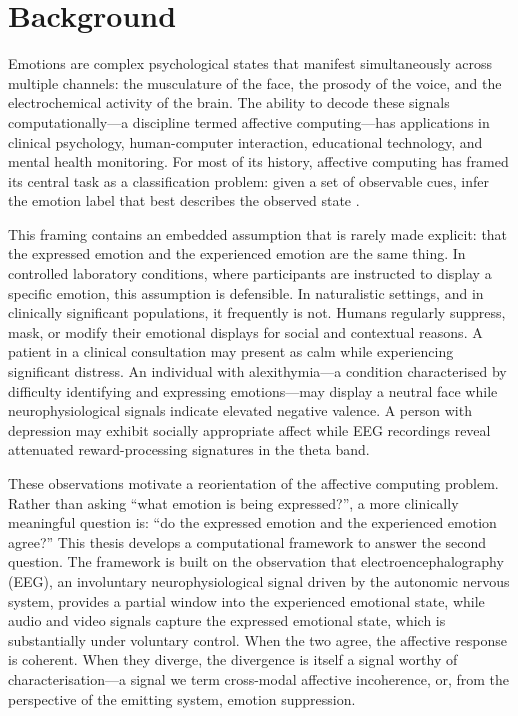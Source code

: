 \section{Background}
Emotions are complex psychological states that manifest simultaneously across multiple channels: the musculature of the face, the prosody of the voice, and the electrochemical activity of the brain. The ability to decode these signals computationally---a discipline termed affective computing---has applications in clinical psychology, human-computer interaction, educational technology, and mental health monitoring. For most of its history, affective computing has framed its central task as a classification problem: given a set of observable cues, infer the emotion label that best describes the observed state \cite{Picard1997AffectiveComputing}.

This framing contains an embedded assumption that is rarely made explicit: that the expressed emotion and the experienced emotion are the same thing. In controlled laboratory conditions, where participants are instructed to display a specific emotion, this assumption is defensible. In naturalistic settings, and in clinically significant populations, it frequently is not. Humans regularly suppress, mask, or modify their emotional displays for social and contextual reasons. A patient in a clinical consultation may present as calm while experiencing significant distress. An individual with alexithymia---a condition characterised by difficulty identifying and expressing emotions---may display a neutral face while neurophysiological signals indicate elevated negative valence. A person with depression may exhibit socially appropriate affect while EEG recordings reveal attenuated reward-processing signatures in the theta band.

These observations motivate a reorientation of the affective computing problem. Rather than asking ``what emotion is being expressed?'', a more clinically meaningful question is: ``do the expressed emotion and the experienced emotion agree?'' This thesis develops a computational framework to answer the second question. The framework is built on the observation that electroencephalography (EEG), an involuntary neurophysiological signal driven by the autonomic nervous system, provides a partial window into the experienced emotional state, while audio and video signals capture the expressed emotional state, which is substantially under voluntary control. When the two agree, the affective response is coherent. When they diverge, the divergence is itself a signal worthy of characterisation---a signal we term cross-modal affective incoherence, or, from the perspective of the emitting system, emotion suppression.


